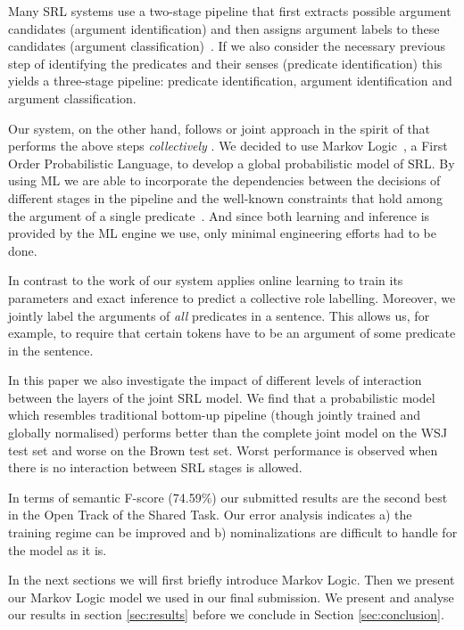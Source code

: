 
 
Many SRL systems use a two-stage pipeline that first extracts possible argument candidates (argument identification) and then assigns argument labels to these candidates (argument classification)~\citep{xue04calibrating}. If we also consider the necessary previous step of identifying the predicates and their senses (predicate identification) this yields a three-stage pipeline: predicate identification, argument identification and argument classification. 

Our system, on the other hand, follows or joint approach in the spirit of \cite{toutanova05joint} that performs the above steps \emph{collectively} . We decided to use Markov Logic~\citep[ML,][]{richardson05markov}, a First Order Probabilistic Language, to develop a global probabilistic model of SRL. By using ML we are able to incorporate the dependencies between the decisions of different stages in the pipeline and the well-known constraints that hold among the argument of a single predicate~\citep{punyakanok05generalized}. And since both learning and inference is provided by the ML engine we use, only minimal engineering efforts had to be done.

In contrast to the work of \cite{toutanova05joint} our system applies online learning to train its parameters and exact inference to predict a collective role labelling. Moreover, we jointly label the arguments of \emph{all} predicates in a sentence. This allows us, for example, to require that certain tokens have to be an argument of some predicate in the sentence.  

In this paper we also investigate the impact of different levels of interaction between the layers of the joint SRL model. We find that a probabilistic model which resembles traditional bottom-up pipeline (though jointly trained and globally normalised) performs better than the complete joint model on the WSJ test set and worse on the Brown test set. Worst performance is observed when there is no interaction between SRL stages is allowed.

In terms of semantic F-score (74.59\%) our submitted results are the second best in the Open Track of the Shared Task. Our error analysis indicates a) the training regime can be improved and b) nominalizations are difficult to handle for the model as it is. 

In the next sections we will first briefly introduce Markov Logic. Then we present our Markov Logic model we used in our final submission. We present and analyse our results in section \ref{sec:results} before we conclude in Section \ref{sec:conclusion}.

